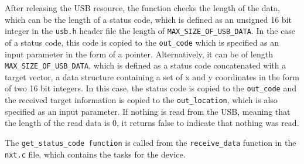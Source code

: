 After releasing the USB resource, the function checks the length of the data, which can be the length of a status code, which is defined as an unsigned 16 bit integer in the \texttt{usb.h} header file the length of \texttt{MAX\_SIZE\_OF\_USB\_DATA}.
In the case of a status code, this code is copied to the \texttt{out\_code} which is specified as an input parameter in the form of a pointer.
Alternatively, it can be of length \texttt{MAX\_SIZE\_OF\_USB\_DATA}, which is defined as a status code concatenated with a target vector, a data structure containing a set of x and y coordinates in the form of two 16 bit integers.
In this case, the status code is copied to the \texttt{out\_code} and the received target information is copied to the \texttt{out\_location}, which is also specified as an input parameter. 
If nothing is read from the USB, meaning that the length of the read data is $0$, it returns false to indicate that nothing was read.

The \texttt{get\_status\_code function} is called from the \texttt{receive\_data} function in the \texttt{nxt.c} file, which contains the tasks for the device.
